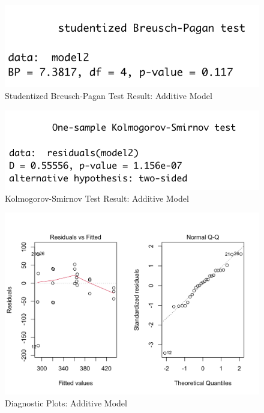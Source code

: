 \documentclass[11pt,a4paper]{article}
\begin{document}
\begin{figure}[htb]
    \centering
    \includegraphics[scale=1]{BP1}
    \caption{Studentized Breusch-Pagan Test Result: Additive Model}
    \label{}
\end{figure}
\begin{figure}[htb]
    \centering
    \includegraphics[scale=1]{KS1}
    \caption{Kolmogorov-Smirnov Test Result: Additive Model}
    \label{}
\end{figure}
\begin{figure}[htb]
    \centering
    \includegraphics[scale=0.3]{DP1}
    \caption{Diagnostic Plots: Additive Model}
    \label{}
\end{figure}
\end{document}

